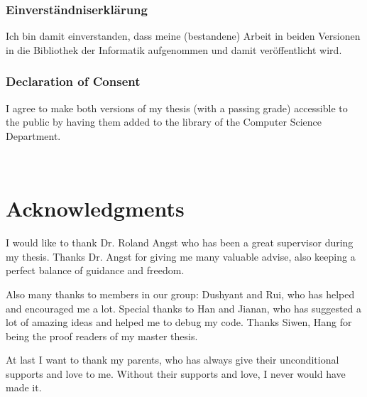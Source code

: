 \vspace{1cm}

\subsubsection*{Einverst{\"a}ndniserkl{\"a}rung}
Ich bin damit einverstanden, dass meine (bestandene) Arbeit in beiden Versionen in die
Bibliothek der Informatik aufgenommen und damit ver{\"o}ffentlicht wird.

\subsubsection*{Declaration of Consent}
I agree to make both versions of my thesis (with a passing grade) accessible to the public 
by having them added to the library of the Computer Science Department.

\vspace{3cm}

\par\noindent\makebox[2in]{\hrulefill} 		\hfill\makebox[2in]{\hrulefill}%
\par\noindent{}	\hfill{}%

\newpage
\
\newpage
\section*{Acknowledgments}
I would like to thank Dr. Roland Angst who has been a great supervisor during my thesis. Thanks Dr. Angst for giving me many valuable advise, also keeping a perfect balance of guidance and freedom. 

Also many thanks to members in our group: Dushyant and Rui, who has helped and encouraged me a lot. Special thanks to Han and Jianan, who has suggested a lot of amazing ideas and helped me to debug my code. Thanks Siwen, Hang for being the proof readers of my master thesis. 

At last I want to thank my parents, who has always give their unconditional supports and love to me. Without their supports and love, I never would have made it.

\pagestyle{empty}
\setcounter{savepage}{\thepage}
\begin{abstractpage}
    
\end{abstractpage}

